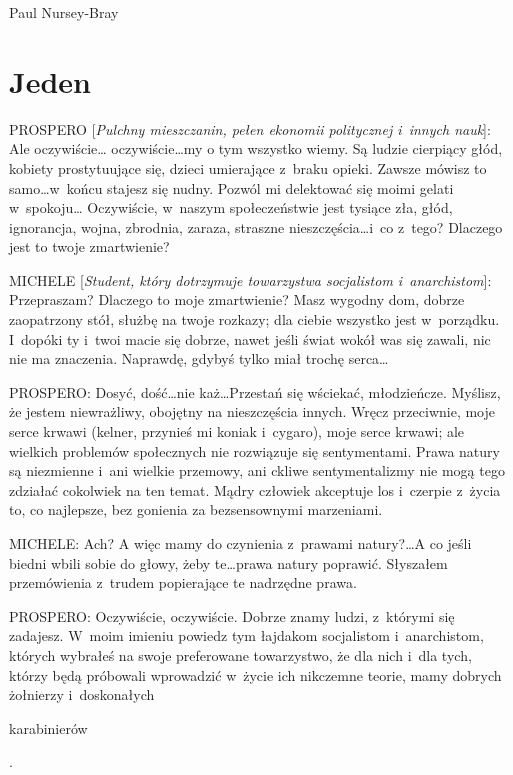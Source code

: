 \documentclass[oneside,polish,11pt,sfheadings]{mwbk}
\begin{document}
Paul Nursey-Bray\ 


\chapter*{Jeden}



 
\noindent PROSPERO [\textit{Pulchny mieszczanin, pełen ekonomii politycznej i~innych nauk}]: Ale oczywiście\ldots
oczywiście\ldots my o tym wszystko wiemy. Są ludzie cierpiący głód, kobiety prostytuujące się, dzieci umierające z~braku
opieki. Zawsze mówisz to samo\ldots w~końcu stajesz się nudny. Pozwól mi delektować się moimi gelati w~spokoju\ldots
Oczywiście, w~naszym społeczeństwie jest tysiące zła, głód, ignorancja, wojna, zbrodnia, zaraza, straszne
nieszczęścia\ldots i~co z~tego? Dlaczego jest to twoje zmartwienie? 




 
\noindent MICHELE [\textit{Student, który dotrzymuje towarzystwa socjalistom i~anarchistom}]: Przepraszam? Dlaczego to moje
zmartwienie? Masz wygodny dom, dobrze zaopatrzony stół, służbę na twoje rozkazy; dla ciebie wszystko jest w~porządku. I~dopóki ty i~twoi macie się dobrze, nawet jeśli świat wokół was się zawali, nic nie ma znaczenia. Naprawdę, gdybyś tylko
miał trochę serca\ldots 




 
\noindent PROSPERO: Dosyć, dość\ldots nie każ\ldots Przestań się wściekać, młodzieńcze. Myślisz, że jestem niewrażliwy, obojętny na
nieszczęścia innych. Wręcz przeciwnie, moje serce krwawi (kelner, przynieś mi koniak i~cygaro), moje serce krwawi; ale
wielkich problemów społecznych nie rozwiązuje się sentymentami. Prawa natury są niezmienne i~ani wielkie przemowy, ani
ckliwe sentymentalizmy nie mogą tego zdziałać cokolwiek na ten temat. Mądry człowiek akceptuje los i~czerpie z~życia
to, co najlepsze, bez gonienia za bezsensownymi marzeniami. 




 
\noindent MICHELE: Ach? A więc mamy do czynienia z~prawami natury?\ldots A co jeśli biedni wbili sobie do głowy, żeby te\ldots prawa
natury poprawić. Słyszałem przemówienia z~trudem popierające te nadrzędne prawa. 




 
\noindent PROSPERO: Oczywiście, oczywiście. Dobrze znamy ludzi, z~którymi się zadajesz. W~moim imieniu powiedz tym łajdakom
socjalistom i~anarchistom, których wybrałeś na swoje preferowane towarzystwo, że dla nich i~dla tych, którzy będą
próbowali wprowadzić w~życie ich nikczemne teorie, mamy dobrych żołnierzy i~doskonałych
\begin{itshape}karabinierów \end{itshape}. 
\end{document}
